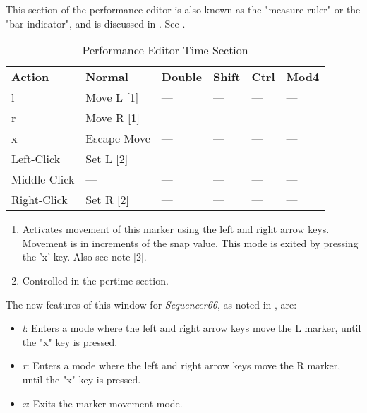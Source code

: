    This section of the performance editor is also known as the "measure ruler"
   or the "bar indicator", and is discussed in
   .
   See .

   \begin{table}[H]
      \centering
      \caption{Performance Editor Time Section}
      \label{table:performance_editor_time_section}
      \begin{tabular}{l l l l l l}
         \textbf{Action}   & \textbf{Normal} & \textbf{Double}    & \textbf{Shift} & \textbf{Ctrl}   & \textbf{Mod4}      \\
         l                 & Move L [1]      & ---                & ---            & ---             & ---                \\
         r                 & Move R [1]      & ---                & ---            & ---             & ---                \\
         x                 & Escape Move     & ---                & ---            & ---             & ---                \\
         Left-Click        & Set L [2]       & ---                & ---            & ---             & ---                \\
         Middle-Click      & ---             & ---                & ---            & ---             & ---                \\
         Right-Click       & Set R [2]       & ---                & ---            & ---             & ---                \\
      \end{tabular}
   \end{table}

   \begin{enumerate}
      \item Activates movement of this marker using the left and right arrow
         keys.  Movement is in increments of the snap value.  This mode is
         exited by pressing the 'x' key.  Also see note [2].
      \item Controlled in the pertime section.
   \end{enumerate}

   The new features of this window for \textsl{Sequencer66},
   as noted in
   ,
   are:

   \begin{itemize}
      \item \textsl{l}:  Enters a mode where the left and right arrow keys move
         the L marker, until the "x" key is pressed.
      \item \textsl{r}:  Enters a mode where the left and right arrow keys move
         the R marker, until the "x" key is pressed.
      \item \textsl{x}:  Exits the marker-movement  mode.
   \end{itemize}

